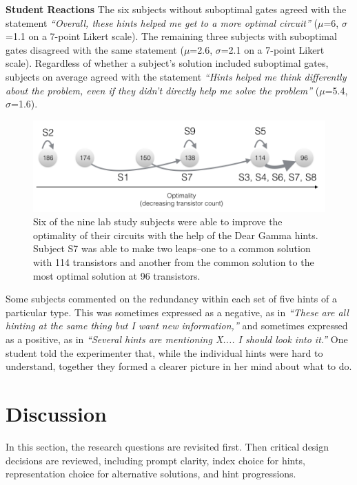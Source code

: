 {\bf Student Reactions} The six subjects without suboptimal gates agreed with the statement {\it ``Overall, these hints helped me get to a more optimal circuit''} ($\mu$=6, $\sigma$=1.1 on a 7-point Likert scale). The remaining three subjects with suboptimal gates disagreed with the same statement ($\mu$=2.6, $\sigma$=2.1 on a 7-point Likert scale). Regardless of whether a subject's solution included suboptimal gates, subjects on average agreed with the statement {\it ``Hints helped me think differently about the problem, even if they didn't directly help me solve the problem'' } ($\mu$=5.4, $\sigma$=1.6).



\begin{figure}
\centering
\includegraphics[width=1.0\columnwidth]{Body/figures/classoverflow/dearGammaResults.png}
\caption{Six of the nine lab study subjects were able to improve the optimality of their circuits with the help of the Dear Gamma hints. Subject S7 was able to make two leaps--one to a common solution with 114 transistors and another from the common solution to the most optimal solution at 96 transistors.}
\label{fig:gammaresults}
\end{figure}

Some subjects commented on the redundancy within each set of five hints of a particular type. This was sometimes expressed as a negative, as in {\it ``These are all hinting at the same thing but I want new information,''} and sometimes expressed as a positive, as in {\it ``Several hints are mentioning X.... I should look into it.''} One student told the experimenter that, while the individual hints were hard to understand, together they formed a clearer picture in her mind about what to do.


\section{Discussion}
In this section, the research questions are revisited first. Then critical design decisions are reviewed, including prompt clarity, index choice for hints, representation choice for alternative solutions, and hint progressions.

